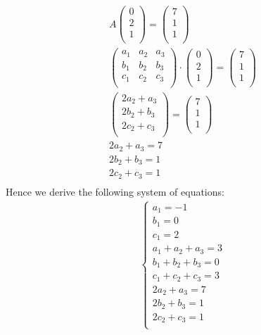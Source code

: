 \documentclass{article}
\begin{document}
\begin{gather*}
  A \begin{pmatrix}
      0 \\
      2 \\
      1 \\
    \end{pmatrix} = 
    \begin{pmatrix}
      7 \\
      1 \\
      1 \\
    \end{pmatrix} \\
  \begin{pmatrix}
    a_1 & a_2 & a_3 \\
    b_1 & b_2 & b_3 \\
    c_1 & c_2 & c_3 \\
  \end{pmatrix} \cdot 
  \begin{pmatrix}
    0 \\
    2 \\
    1 \\
  \end{pmatrix} = 
  \begin{pmatrix}
    7 \\
    1 \\
    1 \\
  \end{pmatrix} \\
  \begin{pmatrix}
    2a_2 + a_3 \\
    2b_2 + b_3 \\
    2c_2 + c_3 \\
  \end{pmatrix} = 
  \begin{pmatrix}
    7 \\
    1 \\
    1 \\
  \end{pmatrix} \\
  2a_2 + a_3 = 7 \\
  2b_2 + b_3 = 1 \\
  2c_2 + c_3 = 1 \\
\end{gather*}
Hence we derive the following system of equations:
\begin{gather*}
  \begin{cases}
     a_1 = -1 \\
     b_1 = 0 \\
     c_1 = 2 \\
     a_1 + a_2 + a_3 = 3 \\
     b_1 + b_2 + b_3 = 0 \\
     c_1 + c_2 + c_3 = 3 \\
     2a_2 + a_3 = 7 \\
     2b_2 + b_3 = 1 \\
     2c_2 + c_3 = 1 \\
  \end{cases} \\
\end{gather*}
\end{document}
